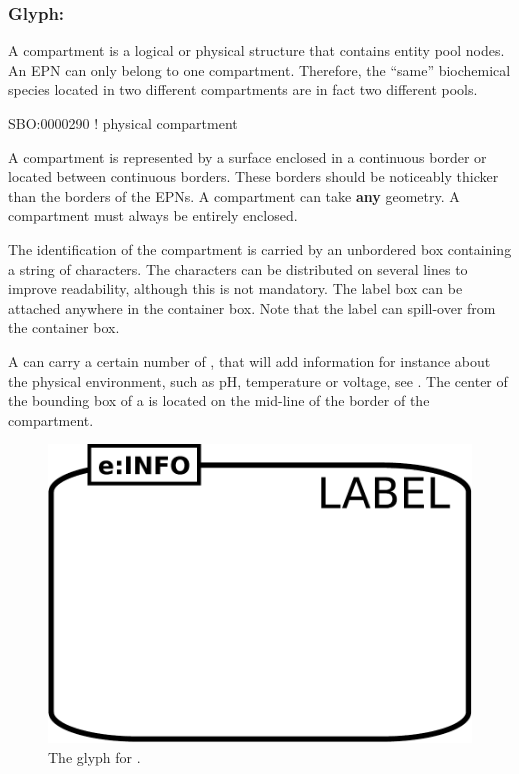 
\subsubsection{Glyph: }\label{sec:compartment}

A compartment is a logical or physical structure that contains entity pool nodes. An EPN can only belong to one compartment. Therefore, the ``same'' biochemical species located in two different compartments are in fact two different pools.

\begin{glyphDescription}

\glyphSboTerm  SBO:0000290 ! physical compartment 

\glyphContainer A compartment is represented by a surface enclosed in a continuous border or located between continuous borders. These borders should be noticeably thicker than the borders of the EPNs. A compartment can take \textbf{any} geometry. A compartment must always be entirely enclosed.

\glyphLabel The identification of the compartment is carried by an unbordered box containing a string of characters. The characters can be distributed on several lines to improve readability, although this is not mandatory. The label box can be attached anywhere in the container box. Note that the label can spill-over from the container box.

\glyphAux A  can carry a certain number of , that will add information for instance about the physical environment, such as pH, temperature or voltage, see .  The center of the bounding box of a  is located on the mid-line of the border of the compartment.

\end{glyphDescription}

\begin{figure}[H]
  \centering
  \includegraphics[scale = 0.3]{images/compartment}
  \caption{The \PD glyph for .}
  \label{fig:compartment}
\end{figure}


